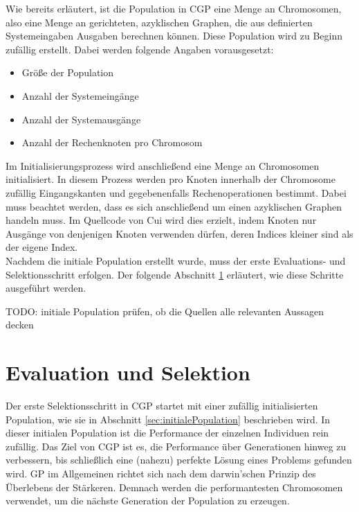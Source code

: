 Wie bereits erläutert, ist die Population in CGP eine Menge an Chromosomen, also eine Menge an gerichteten, azyklischen Graphen, die aus definierten Systemeingaben Ausgaben berechnen können.
Diese Population wird zu Beginn zufällig erstellt.
Dabei werden folgende Angaben vorausgesetzt:
\begin{itemize}
    \item Größe der Population
    \item Anzahl der Systemeingänge
    \item Anzahl der Systemausgänge
    \item Anzahl der Rechenknoten pro Chromosom
\end{itemize}
Im Initialisierungsprozess wird anschließend eine Menge an Chromosomen initialisiert.
In diesem Prozess werden pro Knoten innerhalb der Chromosome zufällig Eingangskanten und gegebenenfalls Rechenoperationen bestimmt.
Dabei muss beachtet werden, dass es sich anschließend um einen azyklischen Graphen handeln muss.
Im Quellcode von Cui wird dies erzielt, indem Knoten nur Ausgänge von denjenigen Knoten verwenden dürfen, deren Indices kleiner sind als der eigene Index.\\

Nachdem die initiale Population erstellt wurde, muss der erste Evaluations- und Selektionsschritt erfolgen. 
Der folgende Abschnitt \ref{sec:evalUndSelektion} erläutert, wie diese Schritte ausgeführt werden.

TODO: initiale Population prüfen, ob die Quellen alle relevanten Aussagen decken

\section{Evaluation und Selektion}
\label{sec:evalUndSelektion}

Der erste Selektionsschritt in CGP startet mit einer zufällig initialisierten Population, wie sie in Abschnitt \ref{sec:initialePopulation} beschrieben wird.
In dieser initialen Population ist die Performance der einzelnen Individuen rein zufällig.
Das Ziel von CGP ist es, die Performance über Generationen hinweg zu verbessern, bis schließlich eine (nahezu) perfekte Lösung eines Problems gefunden wird.
GP im Allgemeinen richtet sich nach dem darwin'schen Prinzip des Überlebens der Stärkeren.
Demnach werden die performantesten Chromosomen verwendet, um die nächste Generation der Population zu erzeugen. \cite{koza_survey_1995}\\

